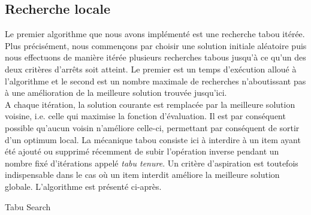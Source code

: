 \documentclass[a4paper,10pt]{report}
\begin{document}
\subsection{Recherche locale}

\hspace{1cm}Le premier algorithme que nous avons implémenté est une recherche tabou itérée. Plus précisément, nous commençons par choisir une solution initiale aléatoire puis nous effectuons de manière itérée plusieurs recherches tabous jusqu'à ce qu'un des deux critères d'arrêts soit atteint. Le premier est un temps d'exécution alloué à l'algorithme et le second est un nombre maximale de recherches n'aboutissant pas à une amélioration de la meilleure solution trouvée jusqu'ici. \\

\hspace{1cm}A chaque itération, la solution courante est remplacée par la meilleure solution voisine, i.e. celle qui maximise la fonction d'évaluation. Il est par conséquent possible qu'aucun voisin n'améliore celle-ci, permettant par conséquent de sortir d'un optimum local. La mécanique tabou consiste ici à interdire à un item ayant été ajouté ou supprimé récemment de subir l'opération inverse pendant un nombre fixé d'itérations appelé \emph{tabu tenure}. Un critère d'aspiration est toutefois indispensable dans le cas où un item interdit améliore la meilleure solution globale. L'algorithme est présenté ci-après.
	
\begin{algorithm}[H]
\caption{Tabu Search}


\end{algorithm}
\end{document}
